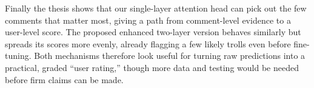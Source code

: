 \documentclass[twoside]{ctuthesis}
\theoremstyle{plain}
\theoremstyle{definition}
\theoremstyle{note}
\begin{document}
Finally the thesis shows that our single-layer attention head can pick out the few comments that matter most, giving a path from comment-level evidence to a user-level score. The proposed enhanced two-layer version behaves similarly but spreads its scores more evenly, already flagging a few likely trolls even before fine-tuning. Both mechanisms therefore look useful for turning raw predictions into a practical, graded “user rating,” though more data and testing would be needed before firm claims can be made.

\appendix

\printindex

 

\end{document}

